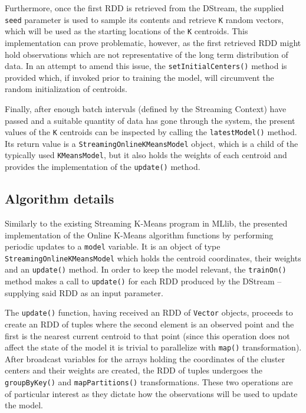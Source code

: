 \documentclass{l4proj}
\begin{document}
Furthermore, once the first RDD is retrieved from the DStream, the supplied \texttt{seed} parameter is used to sample its contents and retrieve \texttt{K} random vectors, which will be used as the starting locations of the \texttt{K} centroids. This implementation can prove problematic, however, as the first retrieved RDD might hold observations which are not representative of the long term distribution of data. In an attempt to amend this issue, the \texttt{setInitialCenters()} method is provided which, if invoked prior to training the model, will circumvent the random initialization of centroids.

Finally, after enough batch intervals (defined by the Streaming Context) have passed and a suitable quantity of data has gone through the system, the present values of the \texttt{K} centroids can be inspected by calling the \texttt{latestModel()} method. Its return value is a \texttt{StreamingOnlineKMeansModel} object, which is a child of the typically used \texttt{KMeansModel}, but it also holds the weights of each centroid and provides the implementation of the \texttt{update()} method.

\subsection{Algorithm details}

Similarly to the existing Streaming K-Means program in MLlib, the presented implementation of the Online K-Means algorithm functions by performing periodic updates to a \texttt{model} variable. It is an object of type \texttt{StreamingOnlineKMeansModel} which holds the centroid coordinates, their weights and an \texttt{update()} method. In order to keep the model relevant, the \texttt{trainOn()} method makes a call to \texttt{update()} for each RDD produced by the DStream -- supplying said RDD as an input parameter.

The \texttt{update()} function, having received an RDD of \texttt{Vector} objects, proceeds to create an RDD of tuples where the second element is an observed point and the first is the nearest current centroid to that point (since this operation does not affect the state of the model it is trivial to parallelize with \texttt{map()} transformation). After broadcast variables for the arrays holding the coordinates of the cluster centers and their weights are created, the RDD of tuples undergoes the \texttt{groupByKey()} and \texttt{mapPartitions()} transformations. These two operations are of particular interest as they dictate how the observations will be used to update the model.
\end{document}
